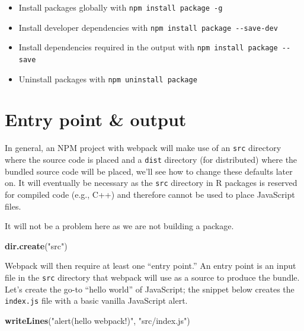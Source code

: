\documentclass[
  10pt,
]{krantz}
\makeatletter
\newenvironment{Shaded}{\begin{snugshade}}{\end{snugshade}}
\newcommand{\KeywordTok}[1]{\textcolor[rgb]{0.27,0.27,0.27}{\textbf{#1}}}
\newcommand{\NormalTok}[1]{#1}
\newcommand{\StringTok}[1]{\textcolor[rgb]{0.5,0.5,0.5}{#1}}
\providecommand{\tightlist}{%
  \setlength{\itemsep}{0pt}\setlength{\parskip}{0pt}}
\newenvironment{kframe}{%
\medskip{}
\setlength{\fboxsep}{.8em}
 \def\at@end@of@kframe{}%
 \ifinner\ifhmode%
  \def\at@end@of@kframe{\end{minipage}}%
  \begin{minipage}{\columnwidth}%
 \fi\fi%
 \def\FrameCommand##1{\hskip\@totalleftmargin \hskip-\fboxsep
 \colorbox{shadecolor}{##1}\hskip-\fboxsep
     \hskip-\linewidth \hskip-\@totalleftmargin \hskip\columnwidth}%
 \MakeFramed {\advance\hsize-\width
   \@totalleftmargin\z@ \linewidth\hsize
   \@setminipage}}%
 {\par\unskip\endMakeFramed%
 \at@end@of@kframe}
\renewenvironment{Shaded}{\begin{kframe}}{\end{kframe}}
\makeatother
\begin{document}
\begin{itemize}
\tightlist
\item
  Install packages globally with \texttt{npm\ install\ package\ -g}
\item
  Install developer dependencies with \texttt{npm\ install\ package\ -\/-save-dev}
\item
  Install dependencies required in the output with \texttt{npm\ install\ package\ -\/-save}
\item
  Uninstall packages with \texttt{npm\ uninstall\ package}
\end{itemize}

\hypertarget{webpack-intro-entry-points}{%
\section{Entry point \& output}\label{webpack-intro-entry-points}}

In general, an NPM project with webpack will make use of an \texttt{src} directory where the source code is placed and a \texttt{dist} directory (for distributed) where the bundled source code will be placed, we'll see how to change these defaults later on. It will eventually be necessary as the \texttt{src} directory in R packages is reserved for compiled code (e.g., C++) and therefore cannot be used to place JavaScript files.

It will not be a problem here as we are not building a package.

\begin{Shaded}
\begin{Highlighting}[]
\KeywordTok{dir.create}\NormalTok{(}\StringTok{"src"}\NormalTok{)}
\end{Highlighting}
\end{Shaded}

Webpack will then require at least one ``entry point.'' An entry point is an input file in the \texttt{src} directory that webpack will use as a source to produce the bundle. Let's create the go-to ``hello world'' of JavaScript; the snippet below creates the \texttt{index.js} file with a basic vanilla JavaScript alert.

\begin{Shaded}
\begin{Highlighting}[]
\KeywordTok{writeLines}\NormalTok{(}\StringTok{"alert(\textquotesingle{}hello webpack!\textquotesingle{})"}\NormalTok{, }\StringTok{"src/index.js"}\NormalTok{) }
\end{Highlighting}
\end{Shaded}
\end{document}
